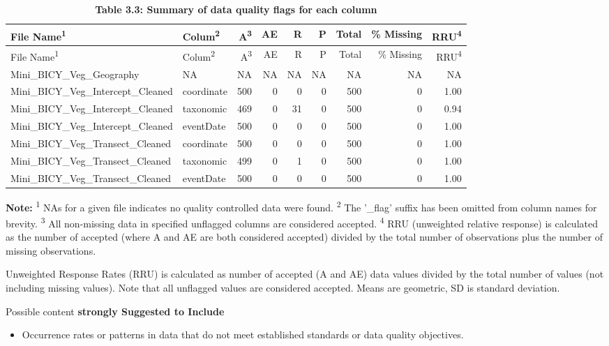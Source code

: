 \documentclass[
]{article}
\providecommand{\tightlist}{%
  \setlength{\itemsep}{0pt}\setlength{\parskip}{0pt}}
\begin{document}
\begin{longtable}[]{@{}llrrrrrrr@{}}
\caption{\textbf{Table 3.3: Summary of data quality flags for each
column}}\tabularnewline
\toprule\noalign{}
File Name\textsuperscript{1} & Colum\textsuperscript{2} &
A\textsuperscript{3} & AE & R & P & Total & \% Missing &
RRU\textsuperscript{4} \\
\midrule\noalign{}
\endfirsthead
\toprule\noalign{}
File Name\textsuperscript{1} & Colum\textsuperscript{2} &
A\textsuperscript{3} & AE & R & P & Total & \% Missing &
RRU\textsuperscript{4} \\
\midrule\noalign{}
\endhead
\bottomrule\noalign{}
\endlastfoot
Mini\_BICY\_Veg\_Geography & NA & NA & NA & NA & NA & NA & NA & NA \\
Mini\_BICY\_Veg\_Intercept\_Cleaned & coordinate & 500 & 0 & 0 & 0 & 500
& 0 & 1.00 \\
Mini\_BICY\_Veg\_Intercept\_Cleaned & taxonomic & 469 & 0 & 31 & 0 & 500
& 0 & 0.94 \\
Mini\_BICY\_Veg\_Intercept\_Cleaned & eventDate & 500 & 0 & 0 & 0 & 500
& 0 & 1.00 \\
Mini\_BICY\_Veg\_Transect\_Cleaned & coordinate & 500 & 0 & 0 & 0 & 500
& 0 & 1.00 \\
Mini\_BICY\_Veg\_Transect\_Cleaned & taxonomic & 499 & 0 & 1 & 0 & 500 &
0 & 1.00 \\
Mini\_BICY\_Veg\_Transect\_Cleaned & eventDate & 500 & 0 & 0 & 0 & 500 &
0 & 1.00 \\
\end{longtable}

\textbf{Note:} \textsuperscript{1} NAs for a given file indicates no
quality controlled data were found. \textsuperscript{2} The '\_flag'
suffix has been omitted from column names for brevity.
\textsuperscript{3} All non-missing data in specified unflagged columns
are considered accepted. \textsuperscript{4} RRU (unweighted relative
response) is calculated as the number of accepted (where A and AE are
both considered accepted) divided by the total number of observations
plus the number of missing observations.

Unweighted Response Rates (RRU) is calculated as number of accepted (A
and AE) data values divided by the total number of values (not including
missing values). Note that all unflagged values are considered accepted.
Means are geometric, SD is standard deviation.

Possible content \textbf{strongly Suggested to Include}

\begin{itemize}
\tightlist
\item
  Occurrence rates or patterns in data that do not meet established
  standards or data quality objectives.
\end{itemize}
\end{document}
